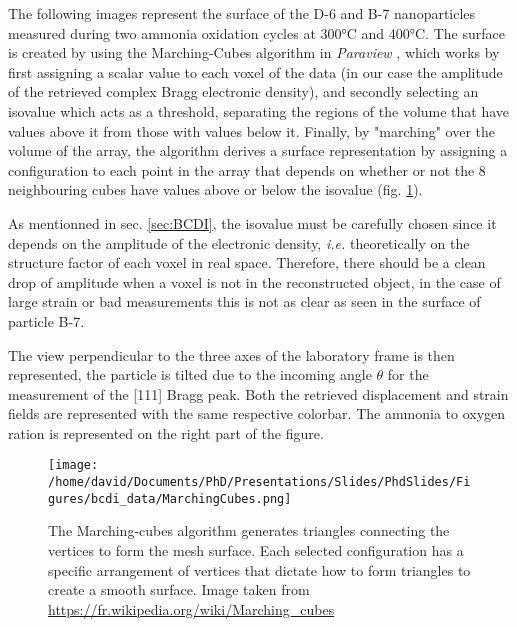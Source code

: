 The following images represent the surface of the D-6 and B-7 nanoparticles measured during two ammonia oxidation cycles at 300°C and 400°C.
The surface is created by using the Marching-Cubes algorithm \parencite{Lorensen1987} in \textit{Paraview} \parencite{Ahrens2001}, which works by first assigning a scalar value to each voxel of the data (in our case the amplitude of the retrieved complex Bragg electronic density), and secondly selecting an isovalue which acts as a threshold, separating the regions of the volume that have values above it from those with values below it.
Finally, by "marching" over the volume of the array, the algorithm derives a surface representation by assigning a configuration to each point in the array that depends on whether or not the 8 neighbouring cubes have values above or below the isovalue (fig. \ref{fig:MarchingCubes}).

As mentionned in sec. \ref{sec:BCDI}, the isovalue must be carefully chosen since it depends on the amplitude of the electronic density, \textit{i.e.} theoretically on the structure factor of each voxel in real space.
Therefore, there should be a clean drop of amplitude when a voxel is not in the reconstructed object, in the case of large strain or bad measurements this is not as clear as seen in the surface of particle B-7.

The view perpendicular to the three axes of the laboratory frame is then represented, the particle is tilted due to the incoming angle $\theta$ for the measurement of the [111] Bragg peak.
Both the retrieved displacement and strain fields are represented with the same respective colorbar.
The ammonia to oxygen ration is represented on the right part of the figure.

\begin{figure}[!htb]
    \centering
    \texttt{[image: /home/david/Documents/PhD/Presentations/Slides/PhdSlides/Figures/bcdi\_data/MarchingCubes.png]}
    \caption{
    The Marching-cubes algorithm generates triangles connecting the vertices to form the mesh surface.
    Each selected configuration has a specific arrangement of vertices that dictate how to form triangles to create a smooth surface.
    Image taken from \url{https://fr.wikipedia.org/wiki/Marching_cubes}
    }
    \label{fig:MarchingCubes}
\end{figure}

\label{ref:AppendixB7}
\label{ref:AppendixD6}